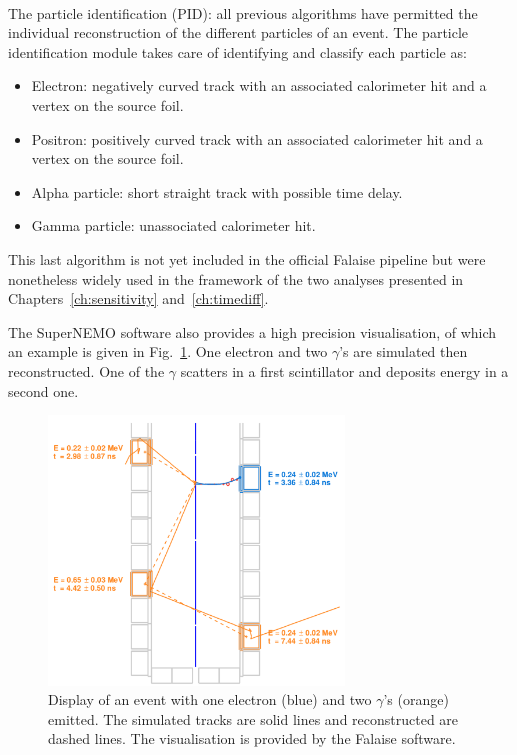 \paragraph{} The particle identification (PID): all previous algorithms have permitted the individual reconstruction of the different particles of an event.
The particle identification module takes care of identifying and classify each particle as:
\begin{itemize}
\item Electron: negatively curved track with an associated calorimeter hit and a vertex on the source foil.
\item Positron: positively curved track with an associated calorimeter hit and a vertex on the source foil.
\item Alpha particle: short straight track with possible time delay.
\item Gamma particle: unassociated calorimeter hit.
\end{itemize}
This last algorithm is not yet included in the official Falaise pipeline but were nonetheless widely used in the framework of the two analyses presented in Chapters~\ref{ch:sensitivity} and~\ref{ch:timediff}.

The SuperNEMO software also provides a high precision visualisation, of which an example is given in Fig.~\ref{fig:visu}.
One electron and two $\gamma$'s are simulated then reconstructed.
One of the $\gamma$ scatters in a first scintillator and deposits energy in a second one.
\begin{figure}[h!]
\centering
\includegraphics[width=0.7\textwidth]{SNdemonstrator/fig_SNdemonstrator/Falaise_visu.pdf}
\caption{Display of an event with one electron (blue) and two $\gamma$'s (orange) emitted.
  The simulated tracks are solid lines and reconstructed are dashed lines.
  The visualisation is provided by the Falaise software.
\label{fig:visu}}
\end{figure}



